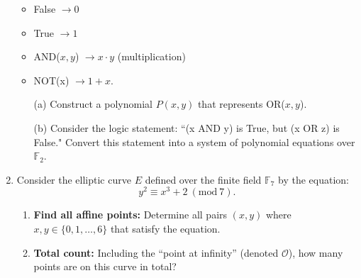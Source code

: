 \documentclass[12pt]{article}
\newcommand{\Mod}[1]{\ (\mathrm{mod}\ #1)}
\newcommand{\field}[1]{\mathbb{#1}}  %
\newcommand{\F}{\field{F}}
\begin{document}
\begin{enumerate}
\begin{itemize}
  \item False $\to 0$
  \item True $\to 1$
  \item AND($x,y$) $\to x\cdot y$ (multiplication)
  \item NOT(x) $\to 1 + x$.
\end{itemize}

\begin{enumerate}
  \item[(a)] Construct a polynomial $P(x,y)$ that represents OR($x,y$).
  \item[(b)] Consider the logic statement: ``(x AND y) is True, but (x OR z) is False." Convert this statement into a system of polynomial equations over $\F_2$.
\end{enumerate}

\item Consider the elliptic curve $E$ defined over the finite field $\mathbb{F}_7$ by the equation:
\[
    y^2 \equiv x^3 + 2 \Mod{7}.
\]

\begin{enumerate}
    \item \textbf{Find all affine points:} Determine all pairs $(x, y)$ where $x, y \in \{0, 1, \dots, 6\}$ that satisfy the equation.
    
    \item \textbf{Total count:} Including the ``point at infinity'' (denoted $\mathcal{O}$), how many points are on this curve in total?
\end{enumerate}

\end{enumerate}
\end{document}
